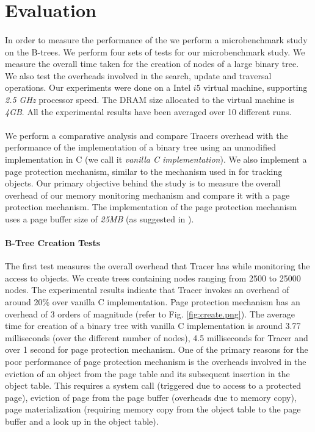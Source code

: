 \section{Evaluation}
\label{sec:eval}
\paragraph{}
In order to measure the performance of the we perform a microbenchmark study on the B-trees. We perform four sets of tests for our microbenchmark study. We measure the overall time taken for the creation of nodes of a large binary tree. We also test the overheads involved in the search, update and traversal operations. Our experiments were done on a Intel $i5$ virtual machine, supporting {\emph{2.5 GHz}} processor speed. The DRAM size allocated to the virtual machine is {\emph{4GB}}. All the experimental results have been averaged over 10 different runs. 

\paragraph{}
We perform a comparative analysis and compare Tracers overhead with the performance of the implementation of a binary tree using an unmodified implementation in C (we call it {\emph{vanilla C implementation}}). We also implement a page protection mechanism, similar to the mechanism used in \cite{SSDAlloc} for tracking objects. Our primary objective behind the study is to measure the overall overhead of our memory monitoring mechanism and compare it with a page protection mechanism. The implementation of the page protection mechanism uses a page buffer size of {\emph{25MB}} (as suggested in \cite{SSDAlloc}).

\paragraph{B-Tree Creation Tests}
The first test measures the overall overhead that Tracer has while monitoring the access to objects. We create trees containing nodes ranging from 2500 to 25000 nodes. The experimental results indicate that Tracer invokes an overhead of around 20\% over vanilla C implementation. Page protection mechanism has an overhead of 3 orders of magnitude (refer to Fig. \ref{fig:create.png}). The average time for creation of a binary tree with vanilla C implementation is around 3.77 milliseconds (over the different number of nodes), 4.5 milliseconds for Tracer and over 1 second for page protection mechanism. One of the primary reasons for the poor performance of page protection mechanism is the overheads involved in the eviction of an object from the page table and its subsequent insertion in the object table. This requires a system call (triggered due to access to a protected page), eviction of page from the page buffer (overheads due to memory copy), page materialization (requiring memory copy from the object table to the page buffer and a look up in the object table). 

